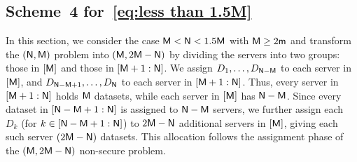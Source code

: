 \documentclass[conference,letterpaper]{IEEEtran}
\begin{document}
\subsection{\texorpdfstring{Scheme~4 for~\eqref{eq:less than 1.5M}}{Scheme 4 for Eq. (Z)}}
\label{sub:less than 1.5M}
In this section, we consider the case \( {\sf M} < {\sf N} < 1.5 {\sf M} \) with \( {\sf M} \ge 2 {\sf m} \) and transform the \(({\sf N},{\sf M})\) problem into \(({\sf M}, 2{\sf M} - {\sf N})\) by dividing the servers into two groups: those in \([{\sf M}]\) and those in \([{\sf M}+1 : {\sf N}]\).
We assign \(D_1, \ldots, D_{{\sf N} - {\sf M}}\) to each server in \([{\sf M}]\), and \(D_{{\sf N} - {\sf M} + 1}, \ldots, D_{{\sf N}}\) to each server in \([{\sf M}+1 : {\sf N}]\). Thus, every server in \([{\sf M}+1 : {\sf N}]\) holds \({\sf M}\) datasets, while each server in \([{\sf M}]\) has \({\sf N} - {\sf M}\). Since every dataset in \([{\sf N} - {\sf M} + 1 : {\sf N}]\) is assigned to \({\sf N} - {\sf M}\) servers, we further assign each \(D_k\) (for \(k \in [{\sf N} - {\sf M} + 1 : {\sf N}]\)) to \(2{\sf M} - {\sf N}\) additional servers in \([{\sf M}]\), giving each such server \((2{\sf M} - {\sf N})\) datasets. This allocation follows the assignment phase of the \(({\sf M}, 2{\sf M} - {\sf N})\) non-secure problem.

\clearpage

 
\clearpage


  \appendices
\end{document}
